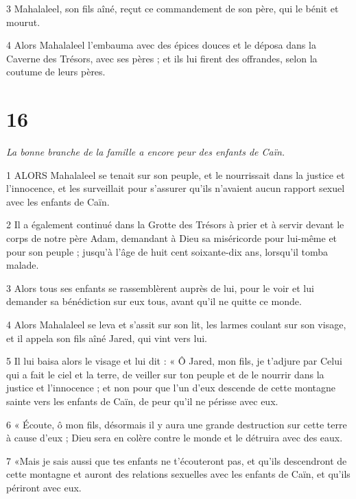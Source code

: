 \par 3 Mahalaleel, son fils aîné, reçut ce commandement de son père, qui le bénit et mourut.

\par 4 Alors Mahalaleel l'embauma avec des épices douces et le déposa dans la Caverne des Trésors, avec ses pères ; et ils lui firent des offrandes, selon la coutume de leurs pères.



\chapter{16}

\par \textit{La bonne branche de la famille a encore peur des enfants de Caïn.}

\par 1 ALORS Mahalaleel se tenait sur son peuple, et le nourrissait dans la justice et l'innocence, et les surveillait pour s'assurer qu'ils n'avaient aucun rapport sexuel avec les enfants de Caïn.

\par 2 Il a également continué dans la Grotte des Trésors à prier et à servir devant le corps de notre père Adam, demandant à Dieu sa miséricorde pour lui-même et pour son peuple ; jusqu'à l'âge de huit cent soixante-dix ans, lorsqu'il tomba malade.

\par 3 Alors tous ses enfants se rassemblèrent auprès de lui, pour le voir et lui demander sa bénédiction sur eux tous, avant qu'il ne quitte ce monde.

\par 4 Alors Mahalaleel se leva et s'assit sur son lit, les larmes coulant sur son visage, et il appela son fils aîné Jared, qui vint vers lui.

\par 5 Il lui baisa alors le visage et lui dit : « Ô Jared, mon fils, je t'adjure par Celui qui a fait le ciel et la terre, de veiller sur ton peuple et de le nourrir dans la justice et l'innocence ; et non pour que l'un d'eux descende de cette montagne sainte vers les enfants de Caïn, de peur qu'il ne périsse avec eux.

\par 6 « Écoute, ô mon fils, désormais il y aura une grande destruction sur cette terre à cause d'eux ; Dieu sera en colère contre le monde et le détruira avec des eaux.

\par 7 «Mais je sais aussi que tes enfants ne t'écouteront pas, et qu'ils descendront de cette montagne et auront des relations sexuelles avec les enfants de Caïn, et qu'ils périront avec eux.

